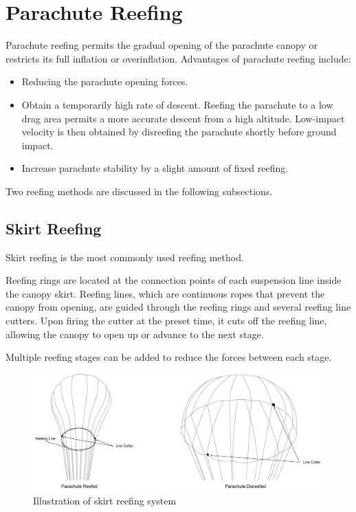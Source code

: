 \newpage

\section{Parachute Reefing}
Parachute reefing permits the gradual opening of the parachute canopy or restricts its full inflation or overinflation. Advantages of parachute reefing include:
\begin{itemize}
		\item Reducing the parachute opening forces. 
		\item Obtain a temporarily high rate of descent. Reefing the parachute to a low drag area permits a more accurate descent from a high altitude. Low-impact velocity is then obtained by disreefing the parachute shortly before ground impact. 
		\item Increase parachute stability by a slight amount of fixed reefing.
\end{itemize}
Two reefing methods are discussed in the following subsections.\cite[Chapter~5.6]{parachute-design}

\subsection{Skirt Reefing}
Skirt reefing is the most commonly used reefing method. 

Reefing rings are located at the connection points of each suspension line inside the canopy skirt. Reefing lines, which are continuous ropes that prevent the canopy from opening, are guided through the reefing rings and several reefing line cutters. Upon firing the cutter at the preset time, it cuts off the reefing line, allowing the canopy to open up or advance to the next stage.

Multiple reefing stages can be added to reduce the forces between each stage.\cite[Chapter~5.6]{parachute-design}

\begin{figure}[h!]
	\centering
	\includegraphics[width=\textwidth]{images/reefing-iilustration}
	\caption{Illustration of skirt reefing system}
	\label{fig:reefing-iilustration}
\end{figure}


